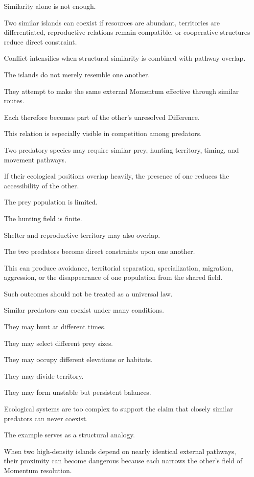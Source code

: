 Similarity alone is not enough.

Two similar islands can coexist if resources are abundant, territories are differentiated, reproductive relations remain compatible, or cooperative structures reduce direct constraint.

Conflict intensifies when structural similarity is combined with pathway overlap.

The islands do not merely resemble one another.

They attempt to make the same external Momentum effective through similar routes.

Each therefore becomes part of the other’s unresolved Difference.

This relation is especially visible in competition among predators.

Two predatory species may require similar prey, hunting territory, timing, and movement pathways.

If their ecological positions overlap heavily, the presence of one reduces the accessibility of the other.

The prey population is limited.

The hunting field is finite.

Shelter and reproductive territory may also overlap.

The two predators become direct constraints upon one another.

This can produce avoidance, territorial separation, specialization, migration, aggression, or the disappearance of one population from the shared field.

Such outcomes should not be treated as a universal law.

Similar predators can coexist under many conditions.

They may hunt at different times.

They may select different prey sizes.

They may occupy different elevations or habitats.

They may divide territory.

They may form unstable but persistent balances.

Ecological systems are too complex to support the claim that closely similar predators can never coexist.

The example serves as a structural analogy.

When two high-density islands depend on nearly identical external pathways, their proximity can become dangerous because each narrows the other’s field of Momentum resolution.

